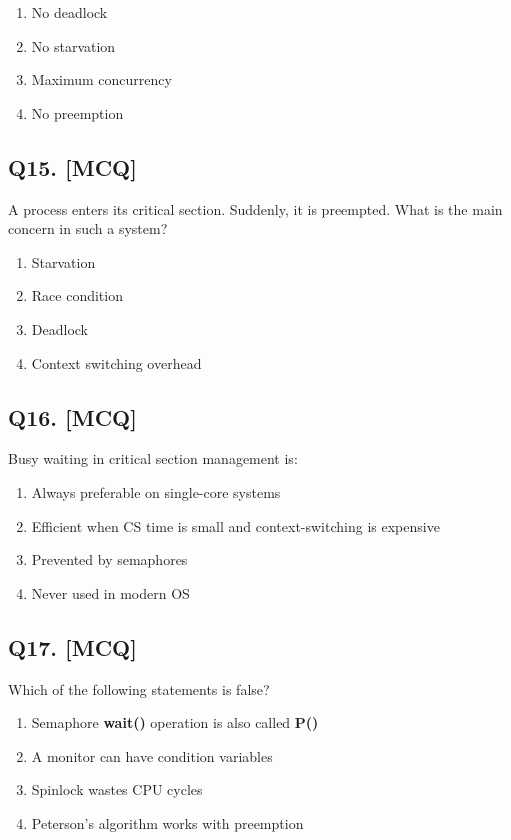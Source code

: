 \begin{enumerate}[label=(\alph*)]
    \item No deadlock
    \item No starvation
    \item Maximum concurrency
    \item No preemption
\end{enumerate}

\subsection*{Q15. [MCQ]}
A process enters its critical section. Suddenly, it is preempted. What is the main concern in such a system?

\begin{enumerate}[label=(\alph*)]
    \item Starvation
    \item Race condition
    \item Deadlock
    \item Context switching overhead
\end{enumerate}

\subsection*{Q16. [MCQ]}
Busy waiting in critical section management is:

\begin{enumerate}[label=(\alph*)]
    \item Always preferable on single-core systems
    \item Efficient when CS time is small and context-switching is expensive
    \item Prevented by semaphores
    \item Never used in modern OS
\end{enumerate}

\subsection*{Q17. [MCQ]}
Which of the following statements is false?

\begin{enumerate}[label=(\alph*)]
    \item Semaphore \textbf{wait()} operation is also called \textbf{P()}
    \item A monitor can have condition variables
    \item Spinlock wastes CPU cycles
    \item Peterson's algorithm works with preemption
\end{enumerate}

